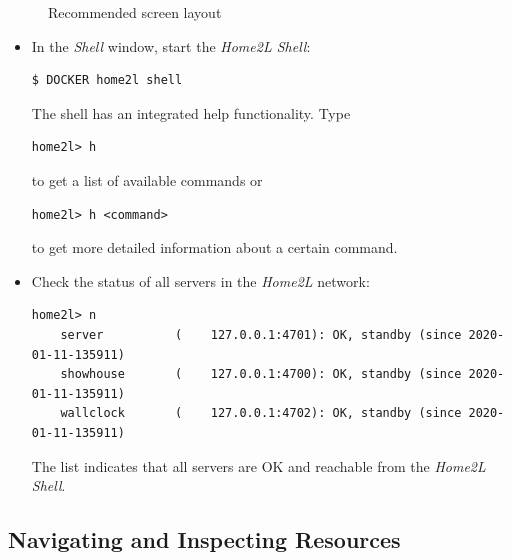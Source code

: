 \documentclass[12pt,english,parskip=half,headheight=19pt]{scrreprt}
\newcommand{\figsvg}[2][]{}            %
\newcommand{\figsvg}[2][]{\href{#2}{}} %
\begin{document}
\begin{figure}[ht]
  \centering
  \figsvg[width=0.95\linewidth,keepaspectratio]{figs/tutorial-layout.svg}
  \caption[l]{Recommended screen layout}
  \label{fig:tutorial-layout}
\end{figure}


\begin{itemize}[$\blacktriangleright$]

\item
  In the \textit{Shell} window, start the \textit{Home2L Shell}:
  \begin{lstlisting}[language=bash]
    $ DOCKER home2l shell
  \end{lstlisting}
  The shell has an integrated help functionality. Type
  \begin{lstlisting}[language=home2l]
    home2l> h
  \end{lstlisting}
  to get a list of available commands or
  \begin{lstlisting}[language=home2l]
    home2l> h <command>
  \end{lstlisting}
  to get more detailed information about a certain command.

\item
  Check the status of all servers in the \textit{Home2L} network:
  \begin{lstlisting}[language=home2l]
    home2l> n
    server          (    127.0.0.1:4701): OK, standby (since 2020-01-11-135911)
    showhouse       (    127.0.0.1:4700): OK, standby (since 2020-01-11-135911)
    wallclock       (    127.0.0.1:4702): OK, standby (since 2020-01-11-135911)
  \end{lstlisting}
  The list indicates that all servers are OK and reachable from the
  \textit{Home2L Shell}.

\end{itemize}





\subsection{Navigating and Inspecting Resources}
\label{sec:tutorial-shell-inspect}
\end{document}
